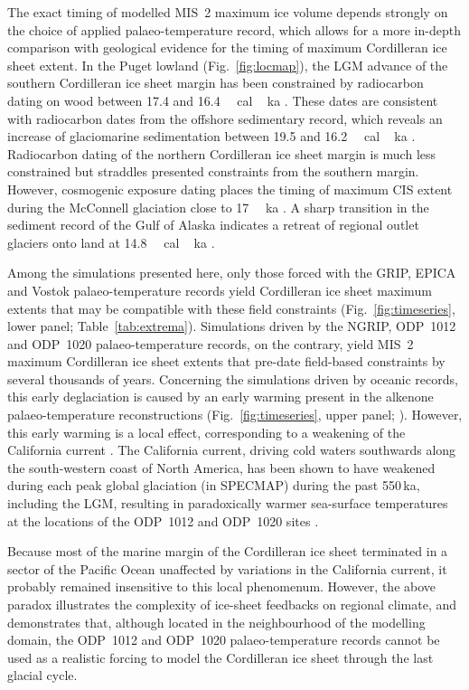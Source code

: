 \documentclass[tc]{copernicus}
\begin{document}
The exact timing of modelled MIS~2 maximum ice volume depends strongly on the
choice of applied palaeo-temperature record, which allows for a more in-depth
comparison with geological evidence for the timing of maximum Cordilleran ice
sheet extent. In the Puget lowland (Fig.~\ref{fig:locmap}), the LGM advance of
the southern Cordilleran ice sheet margin has been constrained by radiocarbon
dating on wood between 17.4 and 16.4\,\unit{\,cal\,ka}
\citep{Porter.Swanson.1998}. These dates are consistent with radiocarbon dates
from the offshore sedimentary record, which reveals
an increase of glaciomarine sedimentation between 19.5 and
16.2\,\unit{\,cal\,ka} \citep{Cosma.etal.2008, Taylor.etal.2014}.
Radiocarbon
dating of the northern Cordilleran ice sheet margin is much less constrained
but straddles presented constraints from the southern margin. However,
cosmogenic exposure dating places the timing of maximum CIS extent during the
McConnell glaciation close to 17\,\unit{\,ka}
\citep{Stroeven.etal.2010, Stroeven.etal.2014}. A sharp transition in
the sediment record of the Gulf of Alaska indicates a retreat of regional
outlet glaciers onto land at 14.8\,\unit{\,cal\,ka}
\citep{Davies.etal.2011}.

Among the simulations presented here, only those forced with the GRIP, EPICA
and Vostok palaeo-temperature records yield Cordilleran ice sheet maximum
extents that may be compatible with these field constraints
(Fig.~\ref{fig:timeseries}, lower panel; Table~\ref{tab:extrema}).
Simulations driven by the NGRIP, ODP~1012 and ODP~1020
palaeo-temperature records, on the contrary, yield MIS~2 maximum Cordilleran
ice sheet extents that pre-date field-based constraints by several thousands of
years. Concerning the simulations driven by oceanic records, this early
deglaciation is caused by an early warming present in the alkenone
palaeo-temperature reconstructions (Fig.~\ref{fig:timeseries}, upper panel;
\citealp[Fig.~3]{Herbert.etal.2001}). However, this
early warming is a local effect, corresponding to a weakening of the California
current \citep{Herbert.etal.2001}. The California current, driving cold
waters southwards along the south-western coast of North America,
has been shown to have weakened during each peak global glaciation (in SPECMAP)
during the past 550\,ka, including the LGM, resulting in paradoxically warmer
sea-surface temperatures at the locations of the ODP~1012 and ODP~1020 sites
\citep{Herbert.etal.2001}.

Because most of the marine margin of the Cordilleran ice sheet terminated in a
sector of the Pacific Ocean unaffected by variations in the California current,
it probably remained insensitive to this local phenomenum. However, the above
paradox
illustrates the complexity of ice-sheet feedbacks on regional climate, and
demonstrates that, although located in the neighbourhood of the modelling
domain, the ODP~1012 and ODP~1020 palaeo-temperature records cannot be
used as a realistic forcing to model the Cordilleran ice sheet
through the last glacial cycle.
\end{document}
